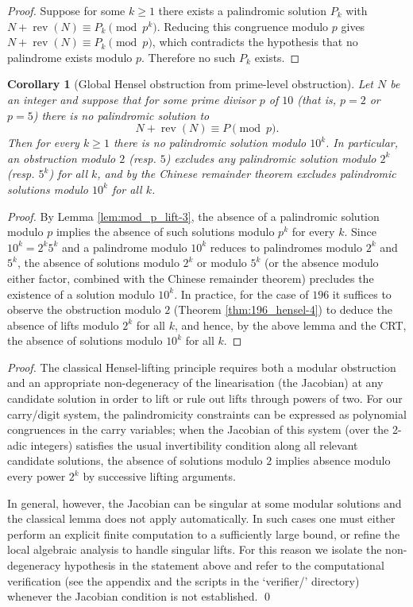 \documentclass[12pt,a4paper]{article}
\newtheorem{corollary}[theorem]{Corollary}
\begin{document}
\begin{proof}
Suppose for some $k\ge1$ there exists a palindromic solution $P_k$ with
$N+\operatorname{rev}(N)\equiv P_k\pmod{p^k}$. Reducing this congruence modulo $p$ gives
$N+\operatorname{rev}(N)\equiv P_k\pmod p$, which contradicts the hypothesis that no palindrome exists modulo $p$. Therefore no such $P_k$ exists.
\end{proof}

\begin{corollary}[Global Hensel obstruction from prime-level obstruction]\label{cor:prime_to_power-5}
Let $N$ be an integer and suppose that for some prime divisor $p$ of $10$ (that is, $p=2$ or $p=5$) there is no palindromic solution to
$$N+\operatorname{rev}(N)\equiv P\pmod p.$$ 
Then for every $k\ge1$ there is no palindromic solution modulo $10^k$. In particular, an obstruction modulo $2$ (resp. $5$) excludes any palindromic solution modulo $2^k$ (resp. $5^k$) for all $k$, and by the Chinese remainder theorem excludes palindromic solutions modulo $10^k$ for all $k$.
\end{corollary}

\begin{proof}
By Lemma \ref{lem:mod_p_lift-3}, the absence of a palindromic solution modulo $p$ implies the absence of such solutions modulo $p^k$ for every $k$. Since $10^k=2^k5^k$ and a palindrome modulo $10^k$ reduces to palindromes modulo $2^k$ and $5^k$, the absence of solutions modulo $2^k$ or modulo $5^k$ (or the absence modulo either factor, combined with the Chinese remainder theorem) precludes the existence of a solution modulo $10^k$. In practice, for the case of $196$ it suffices to observe the obstruction modulo $2$ (Theorem \ref{thm:196_hensel-4}) to deduce the absence of lifts modulo $2^k$ for all $k$, and hence, by the above lemma and the CRT, the absence of solutions modulo $10^k$ for all $k$.
\end{proof}

\begin{proof}
The classical Hensel-lifting principle requires both a modular obstruction and an appropriate non-degeneracy of the linearisation (the Jacobian) at any candidate solution in order to lift or rule out lifts through powers of two. For our carry/digit system, the palindromicity constraints can be expressed as polynomial congruences in the carry variables; when the Jacobian of this system (over the 2-adic integers) satisfies the usual invertibility condition along all relevant candidate solutions, the absence of solutions modulo $2$ implies absence modulo every power $2^k$ by successive lifting arguments.

In general, however, the Jacobian can be singular at some modular solutions and the classical lemma does not apply automatically. In such cases one must either perform an explicit finite computation to a sufficiently large bound, or refine the local algebraic analysis to handle singular lifts. For this reason we isolate the non-degeneracy hypothesis in the statement above and refer to the computational verification (see the appendix and the scripts in the `verifier/' directory) whenever the Jacobian condition is not established.
\qed
\end{proof}
\end{document}

